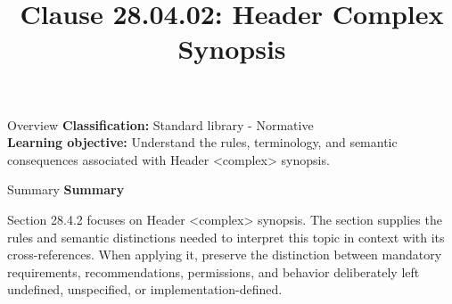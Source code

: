 \documentclass[10pt,letterpaper]{article}
\title{Clause 28.04.02: Header Complex Synopsis}
\author{}
\date{}
\begin{document}
\maketitle
\begin{CornellOverviewBox}{Overview}
\textbf{Classification:} Standard library - Normative\\[2pt]
\textbf{Learning objective:} Understand the rules, terminology, and semantic consequences associated with Header <complex> synopsis.
\end{CornellOverviewBox}\begin{CornellSummaryBox}{Summary}
{\sffamily\bfseries\color{Accent} Summary}\par\vspace{3pt}Section 28.4.2 focuses on Header <complex> synopsis. The section supplies the rules and semantic distinctions needed to interpret this topic in context with its cross-references. When applying it, preserve the distinction between mandatory requirements, recommendations, permissions, and behavior deliberately left undefined, unspecified, or implementation-defined.
\end{CornellSummaryBox}
\end{document}
